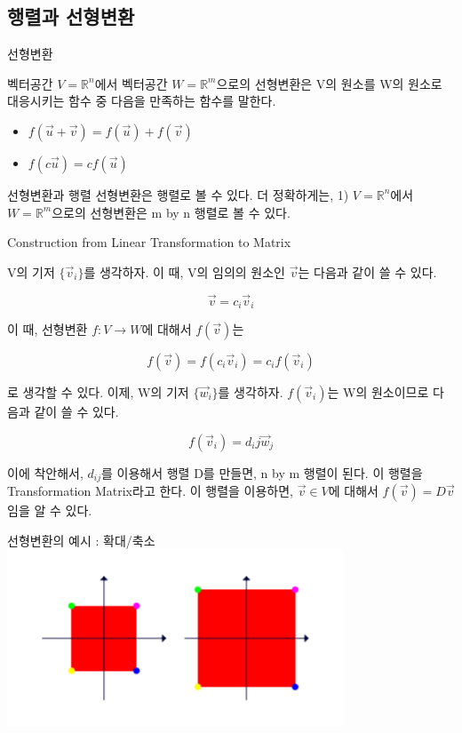 \documentclass{beamer}
\begin{document}
\subsection{행렬과 선형변환} 

\begin{frame}{선형변환} 

벡터공간 $V=\mathds{R}^n$에서 벡터공간 $W=\mathds{R}^m$으로의 선형변환은 V의 원소를 W의 원소로 대응시키는 함수 중 다음을 만족하는 함수를 말한다. 
\begin{itemize} 
\item $f(\vec{u} + \vec{v}) = f(\vec{u}) + f(\vec{v})$
\item $f(c\vec{u}) = c f(\vec{u}) $
\end{itemize}
\end{frame}

\begin{frame}{선형변환과 행렬} 
선형변환은 행렬로 볼 수 있다. 더 정확하게는, 1) $V=\mathds{R}^n$에서 $W=\mathds{R}^m$으로의 선형변환은 m by n 행렬로 볼 수 있다. 
\end{frame}

\begin{frame}[allowframebreaks]{Construction from Linear Transformation to Matrix  }

V의 기저 $\{\vec{v}_i\}$를 생각하자. 이 때, V의 임의의 원소인 $\vec{v}$는 다음과 같이 쓸 수 있다. 

\begin{equation} 
\vec{v} = c_i \vec{v}_i
\end{equation}

이 때, 선형변환 $f:V \rightarrow W$에 대해서 $f(\vec{v})$는 

\begin{equation}
f(\vec{v}) = f(c_i \vec{v}_i) = c_i f(\vec{v}_i)
\end{equation} 

로 생각할 수 있다. 이제, W의 기저 $\{\vec{w}_i\}$를 생각하자. $f(\vec{v}_i)$는 W의 원소이므로 다음과 같이 쓸 수 있다. 

\begin{equation}
f(\vec{v}_i) = d_ij \vec{w}_j
\end{equation} 

이에 착안해서, $d_{ij}$를 이용해서 행렬 D를 만들면, n by m 행렬이 된다. 이 행렬을 Transformation Matrix라고 한다. 이 행렬을 이용하면, $\vec{v} \in V$에 대해서 $f(\vec{v}) =  D \vec{v}$ 임을 알 수 있다. 
\end{frame}

\begin{frame}{선형변환의 예시 : 확대/축소} 
\includegraphics[width=10cm,keepaspectratio]{scale1}
\end{frame}
\end{document}
